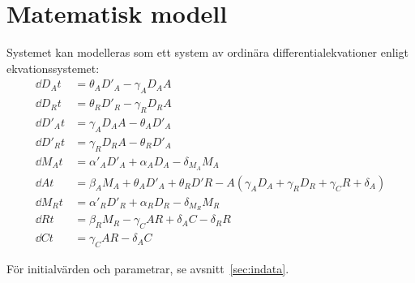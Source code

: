 \section{Matematisk modell}

Systemet kan modelleras som ett system av ordinära differentialekvationer
enligt ekvationssystemet:
\begin{align}
\dd {D_A} t &= \theta_A D'_A - \gamma_A D_A A \\
\dd {D_R} t &= \theta_R D'_R - \gamma_R D_R A \\
\dd {D'_A} t &= \gamma_A D_A A - \theta_A D'_A \\
\dd {D'_R} t &= \gamma_R D_R A - \theta_R D'_A \\
\dd {M_A} t &= \alpha'_A D'_A + \alpha_A D_A - \delta_{M_A}M_A \\
\dd A t &= \beta_A M_A + \theta_AD'_A + \theta_RD'R - A (\gamma_A D_A +
	\gamma_R D_R + \gamma_C R + \delta_A) \\
\dd {M_R} t &= \alpha'_R D'_R + \alpha_R D_R - \delta_{M_R} M_R \\
\dd R t &= \beta_R M_R - \gamma_C A R + \delta_A C - \delta_R R \\
\dd C t &= \gamma_C A R - \delta_A C
\label{eqn:ode}
\end{align}

För initialvärden och parametrar, se avsnitt~\ref{sec:indata}.


